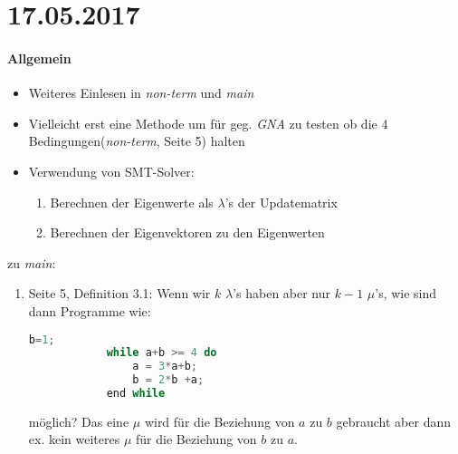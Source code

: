 \section*{17.05.2017}

\paragraph{Allgemein}
\begin{itemize}
	\item Weiteres Einlesen in \emph{non-term} und \emph{main}
	\item Vielleicht erst eine Methode um für geg. \emph{GNA} zu testen ob die 4 Bedingungen(\emph{non-term}, Seite 5) halten
	\item Verwendung von SMT-Solver:
		\begin{enumerate}
			\item Berechnen der Eigenwerte als $\lambda$'s der Updatematrix
			\item Berechnen der Eigenvektoren zu den Eigenwerten
		\end{enumerate}
\end{itemize}

zu \emph{main}:
\begin{enumerate}
	\item Seite 5, Definition 3.1: Wenn wir $k$ $\lambda$'s haben aber nur $k-1$ $\mu$'s, wie sind dann Programme wie: 
		\begin{lstlisting}[language=c, commentstyle=\fontsize{12}{14.4}\selectfont, basicstyle=\ttfamily\fontsize{10}{12}\selectfont]
			b=1;
			while a+b >= 4 do
				a = 3*a+b;
				b = 2*b +a;
			end while 
		\end{lstlisting}
		möglich? Das eine $\mu$ wird für die Beziehung von $a$ zu $b$ gebraucht aber dann ex. kein weiteres $\mu$ für die Beziehung von $b$ zu $a$.
	
\end{enumerate}